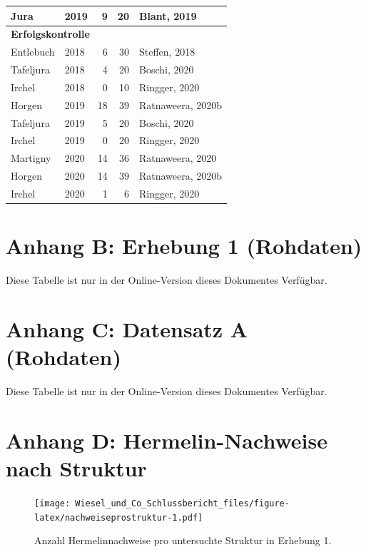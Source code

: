 \documentclass[
  oneside]{scrbook}
\begin{document}
\begin{table}[H]
\begin{tabular}[t]{l|l|r|r|l}
\hline
\hspace{1em}Jura & 2019 & 9 & 20 & Blant, 2019\\
\hline
\multicolumn{5}{l}{\textbf{Erfolgskontrolle}}\\
\hline
\hspace{1em}Entlebuch & 2018 & 6 & 30 & Steffen, 2018\\
\hline
\hspace{1em}Tafeljura & 2018 & 4 & 20 & Boschi, 2020\\
\hline
\hspace{1em}Irchel & 2018 & 0 & 10 & Ringger, 2020\\
\hline
\hspace{1em}Horgen & 2019 & 18 & 39 & Ratnaweera, 2020b\\
\hline
\hspace{1em}Tafeljura & 2019 & 5 & 20 & Boschi, 2020\\
\hline
\hspace{1em}Irchel & 2019 & 0 & 20 & Ringger, 2020\\
\hline
\hspace{1em}Martigny & 2020 & 14 & 36 & Ratnaweera, 2020\\
\hline
\hspace{1em}Horgen & 2020 & 14 & 39 & Ratnaweera, 2020b\\
\hline
\hspace{1em}Irchel & 2020 & 1 & 6 & Ringger, 2020\\
\hline
\end{tabular}
\end{table}

\hypertarget{anhang-b-erhebung-1-rohdaten}{%
\section{Anhang B: Erhebung 1 (Rohdaten)}\label{anhang-b-erhebung-1-rohdaten}}

Diese Tabelle ist nur in der Online-Version dieses Dokumentes Verfügbar.

\hypertarget{anhang-c-datensatz-a-rohdaten}{%
\section{Anhang C: Datensatz A (Rohdaten)}\label{anhang-c-datensatz-a-rohdaten}}

Diese Tabelle ist nur in der Online-Version dieses Dokumentes Verfügbar.

\hypertarget{anhang-d-hermelin-nachweise-nach-struktur}{%
\section{Anhang D: Hermelin-Nachweise nach Struktur}\label{anhang-d-hermelin-nachweise-nach-struktur}}



\begin{figure}
\centering
\texttt{[image: Wiesel\_und\_Co\_Schlussbericht\_files/figure-latex/nachweiseprostruktur-1.pdf]}
\caption{\label{fig:nachweiseprostruktur}Anzahl Hermelinnachweise pro untersuchte Struktur in Erhebung 1.}
\end{figure}
\end{document}
